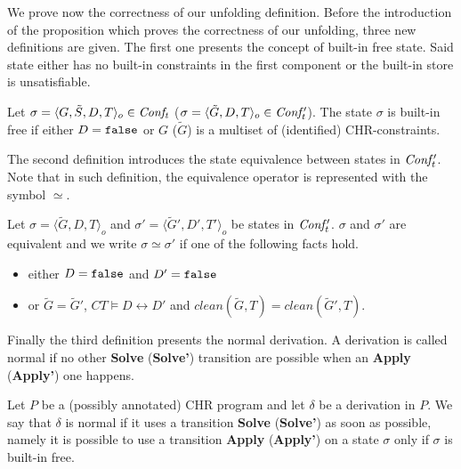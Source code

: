 \documentclass[final]{acmtrans2e}
\newcommand{\la}{\langle}
\newcommand{\ra}{\rangle}
\begin{document}
We prove now the correctness of our unfolding definition.
Before the introduction of the proposition which proves the correctness of our unfolding, three new
definitions are given. The first one presents the concept of built-in
free state. Said state either has no built-in constraints in the first component
or the built-in store is unsatisfiable.

\begin{definition}\label{def:BFS}
Let  $\sigma=\la G, \tilde S , D, T\ra_o\in {\it Conf_t}$ ($\sigma=\la\tilde G , D, T\ra_o\in {\it Conf'_t}$).
The state $\sigma$ is built-in free  if either $D=\tt false$  or
$G$ ($\tilde G$) is a multiset of (identified) CHR-constraints.
\end{definition}

The second definition introduces the state equivalence between states in ${\it Conf'_{t}}$.
Note that in such definition, the
equivalence operator is represented with the symbol $\simeq$.


\begin{definition}\label{def:SE}
Let  $\sigma=\la\tilde G , D, T\ra_o$ and  $\sigma'=\la \tilde G', D', T'\ra_o$ be states in ${\it Conf'_t}$.
$\sigma$ and $\sigma'$ are equivalent and we write $\sigma\simeq\sigma'$ if one of the following facts hold.
\begin{itemize}
  \item either $D=\tt false$ and $D'=\tt false$
  \item or $\tilde G =\tilde G'$, $CT\models D \leftrightarrow D'$ and $clean(\tilde G, T)= clean(\tilde G', T)$.
\end{itemize}
\end{definition}

Finally the third definition presents the normal derivation. A derivation
is called normal if no other \textbf{Solve} (\textbf{Solve'}) transition are possible
when an \textbf{Apply} (\textbf{Apply'}) one happens.

\begin{definition}\label{def:ND}
Let  $P$ be a (possibly annotated) CHR program  and let
$\delta$ be a derivation in $P$.
We say that $\delta$ is normal if it uses a transition
\textbf{Solve} (\textbf{Solve'}) as soon as possible, namely it is possible to use a transition
\textbf{Apply} (\textbf{Apply'})
on a state $\sigma$ only if $\sigma$ is built-in free.
\end{definition}
\end{document}
